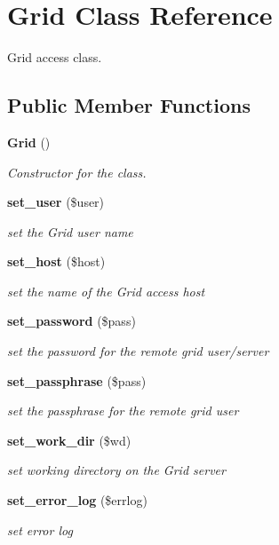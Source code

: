 \section{Grid Class Reference}
\label{classGrid}
Grid access class.  


\subsection*{Public Member Functions}
\begin{CompactItemize}
\item 
{\bf Grid} ()
\begin{CompactList}\small\item\em Constructor for the class. \item\end{CompactList}\item 
{\bf set\_\-user} (\$user)
\begin{CompactList}\small\item\em set the Grid user name \item\end{CompactList}\item 
{\bf set\_\-host} (\$host)
\begin{CompactList}\small\item\em set the name of the Grid access host \item\end{CompactList}\item 
{\bf set\_\-password} (\$pass)
\begin{CompactList}\small\item\em set the password for the remote grid user/server \item\end{CompactList}\item 
{\bf set\_\-passphrase} (\$pass)
\begin{CompactList}\small\item\em set the passphrase for the remote grid user \item\end{CompactList}\item 
{\bf set\_\-work\_\-dir} (\$wd)
\begin{CompactList}\small\item\em set working directory on the Grid server \item\end{CompactList}\item 
{\bf set\_\-error\_\-log} (\$errlog)
\begin{CompactList}\small\item\em set error log \item\end{CompactList}\item 

\end{CompactItemize}
